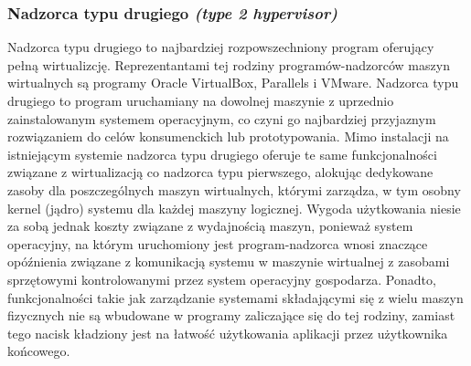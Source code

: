 \subsubsection{Nadzorca typu drugiego \textit{(type 2 hypervisor)}}
Nadzorca typu drugiego to najbardziej rozpowszechniony program oferujący pełną wirtualizcję. Reprezentantami tej rodziny programów-nadzorców maszyn wirtualnych są programy Oracle VirtualBox, Parallels i VMware. Nadzorca typu drugiego to program uruchamiany na dowolnej maszynie z uprzednio zainstalowanym systemem operacyjnym, co czyni go najbardziej przyjaznym rozwiązaniem do celów konsumenckich lub prototypowania. Mimo instalacji na istniejącym systemie nadzorca typu drugiego oferuje te same funkcjonalności związane z wirtualizacją co nadzorca typu pierwszego, alokując dedykowane zasoby dla poszczególnych maszyn wirtualnych, którymi zarządza, w tym osobny kernel (jądro) systemu dla każdej maszyny logicznej. Wygoda użytkowania niesie za sobą jednak koszty związane z wydajnością maszyn, ponieważ system operacyjny, na którym uruchomiony jest program-nadzorca wnosi znaczące opóźnienia związane z komunikacją systemu w maszynie wirtualnej z zasobami sprzętowymi kontrolowanymi przez system operacyjny gospodarza. Ponadto, funkcjonalności takie jak zarządzanie systemami składającymi się z wielu maszyn fizycznych nie są wbudowane w programy zaliczające się do tej rodziny, zamiast tego nacisk kładziony jest na łatwość użytkowania aplikacji przez użytkownika końcowego.

